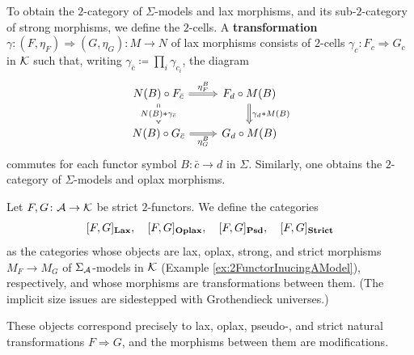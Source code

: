 To obtain the $2$-category of $\Sigma$-models and lax morphisms, and its sub-$2$-category of strong morphisms, we define the $2$-cells. A \textbf{transformation} $\gamma \colon (F,\eta_F) \Rightarrow (G, \eta_G) \colon M \to N$ of lax morphisms consists of $2$-cells $\gamma_c \colon F_c \Rightarrow G_c$ in $\mathcal{K}$ such that, writing $\gamma_{\bar{c}}\coloneqq \prod_i \gamma_{c_i}$, the diagram
\[
\begin{tikzcd}[ampersand replacement=\&]
N(B) \circ F_{\bar{c}} \arrow[d, "N(B)*\gamma_{\bar{c}}" description, Rightarrow] \arrow[r, "\eta^B_F", Rightarrow] \& F_d \circ M(B) \arrow[d, "\gamma_d*M(B)", Rightarrow] \\
N(B) \circ G_{\bar{c}} \arrow[r, "\eta_G^B"', Rightarrow]                                                           \& G_d \circ M(B)
\end{tikzcd}
\]
commutes for each functor symbol $B\colon \bar{c}\to d$ in $\Sigma$. Similarly, one obtains the $2$-category of $\Sigma$-models and oplax morphisms.

\begin{example}\label{ex:modificationsAndTransformations}
Let $F, G \colon \mathcal{A} \to \mathcal{K}$ be strict $2$-functors. We define the categories
\[
[F, G]_\mathbf{Lax}, \quad [F, G]_\mathbf{Oplax}, \quad [F, G]_{\mathbf{Psd}}, \quad [F, G]_\mathbf{Strict}
\]
as the categories whose objects are lax, oplax, strong, and strict morphisms $M_F \to M_G$ of $\Sigma_{\mathcal{A}}$-models in $\mathcal{K}$ (Example \ref{ex:2FunctorInucingAModel}), respectively, and whose morphisms are transformations between them. (The implicit size issues are sidestepped with Grothendieck universes.)

These objects correspond precisely to lax, oplax, pseudo-, and strict natural transformations $F \Rightarrow G$, and the morphisms between them are modifications.
\end{example}

